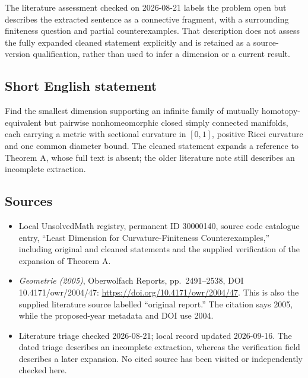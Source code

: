 \documentclass[11pt]{article}
\begin{document}
The literature assessment checked on 2026-08-21 labels the problem open but describes the extracted sentence as a connective fragment, with a surrounding finiteness question and partial counterexamples. That description does not assess the fully expanded cleaned statement explicitly and is retained as a source-version qualification, rather than used to infer a dimension or a current result.
\subsection{Short English statement}
Find the smallest dimension supporting an infinite family of mutually homotopy-equivalent but pairwise nonhomeomorphic closed simply connected manifolds, each carrying a metric with sectional curvature in \([0,1]\), positive Ricci curvature and one common diameter bound. The cleaned statement expands a reference to Theorem A, whose full text is absent; the older literature note still describes an incomplete extraction.
\subsection{Sources}
\begin{itemize}
\item Local UnsolvedMath registry, permanent ID 30000140, source code catalogue entry, ``Least Dimension for Curvature-Finiteness Counterexamples,'' including original and cleaned statements and the supplied verification of the expansion of Theorem A.
\item \emph{Geometrie (2005)}, Oberwolfach Reports, pp.\ 2491--2538, DOI 10.4171/owr/2004/47: \url{https://doi.org/10.4171/owr/2004/47}. This is also the supplied literature source labelled ``original report.'' The citation says 2005, while the proposed-year metadata and DOI use 2004.
\item Literature triage checked 2026-08-21; local record updated 2026-09-16. The dated triage describes an incomplete extraction, whereas the verification field describes a later expansion. No cited source has been visited or independently checked here.
\end{itemize}
\end{document}

